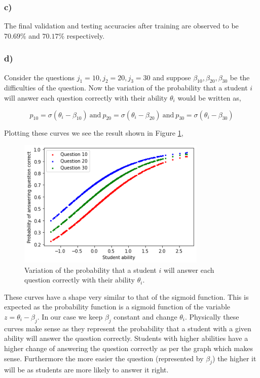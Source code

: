 \documentclass{article}
\begin{document}
\subsubsection*{c)}
The final validation and testing accuracies after training are observed to be $70.69\%$ and $70.17\%$ respectively.

\subsubsection*{d)}
Consider the questions $j_1=10, j_2=20, j_3=30$ and suppose $\beta_{10}, \beta_{20}, \beta_{30}$ be the difficulties of the question. Now the variation of the probability that a student $i$ will answer each question correctly with their ability $\theta_i$ would be written as,

$$p_{10}=\sigma(\theta_i- \beta_{10})\ \text{and}\ p_{20}=\sigma(\theta_i- \beta_{20})\ \text{and}\ p_{30}=\sigma(\theta_i- \beta_{30})$$

Plotting these curves we see the result shown in Figure \ref{fig:questions},

\begin{figure}[H]
    \centering
    \includegraphics[width=9cm]{question answer item response.png}
    \caption{Variation of the probability that a student $i$ will answer each question correctly with their ability $\theta_i$.}
    \label{fig:questions}
\end{figure}

These curves have a shape very similar to that of the sigmoid function. This is expected as the probability function is a sigmoid function of the variable $z=\theta_i-\beta_j$. In our case we keep $\beta_j$ constant and change $\theta_i$. Physically these curves make sense as they represent the probability that a student with a given ability will answer the question correctly. Students with higher abilities have a higher change of answering the question correctly as per the graph which makes sense. Furthermore the more easier the question (represented by $\beta_j$) the higher it will be as students are more likely to answer it right.
\end{document}
